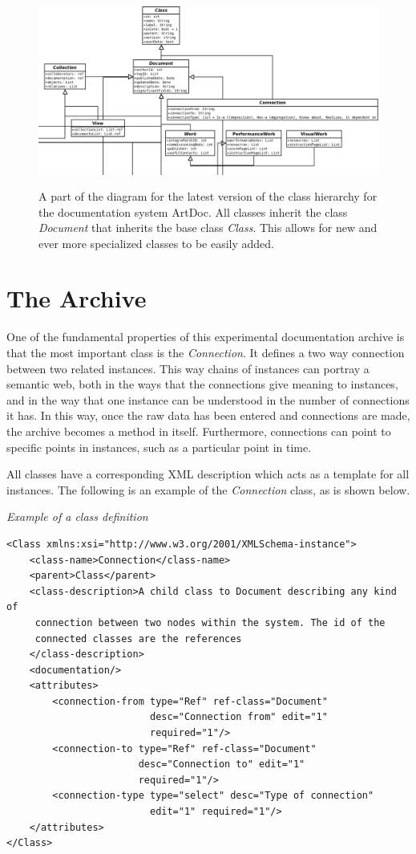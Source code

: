 \documentclass[runningheads,a4paper]{llncs}
\begin{document}
\begin{figure}
\centering
\includegraphics[height=6.2cm]{img/classdiagramC.png}
\caption{A part of the diagram for the latest version of the class hierarchy for the documentation system ArtDoc. All classes inherit the class \emph{Document} that inherits the base class \emph{Class}. This allows for new and ever more specialized classes to be easily added.}
\label{fig:example}
\end{figure}

\section{The Archive}
\label{sec:archive}
One of the fundamental properties of this experimental documentation archive is that the most important class is the \emph{Connection}. It defines a two way connection between two related instances. This way chains of instances can portray a semantic web, both in the ways that the connections give meaning to instances, and in the way that one instance can be understood in the number of connections it has. In this way, once the raw data has been entered and connections are made, the archive becomes a method in itself. Furthermore, connections can point to specific points in instances, such as a particular point in time.

All classes have a corresponding XML description which acts as a template for all instances. The following is an example of the \emph{Connection} class, as is shown below.

\medskip

\noindent
{\it Example of a class definition}
\begin{verbatim}
<Class xmlns:xsi="http://www.w3.org/2001/XMLSchema-instance">
    <class-name>Connection</class-name>
    <parent>Class</parent>
    <class-description>A child class to Document describing any kind of 
     connection between two nodes within the system. The id of the 
     connected classes are the references
    </class-description>
    <documentation/>
    <attributes>
        <connection-from type="Ref" ref-class="Document" 
                         desc="Connection from" edit="1" 
                         required="1"/>
        <connection-to type="Ref" ref-class="Document" 
                       desc="Connection to" edit="1" 
                       required="1"/>
        <connection-type type="select" desc="Type of connection" 
                         edit="1" required="1"/>
    </attributes>
</Class>
\end{verbatim}
\end{document}
